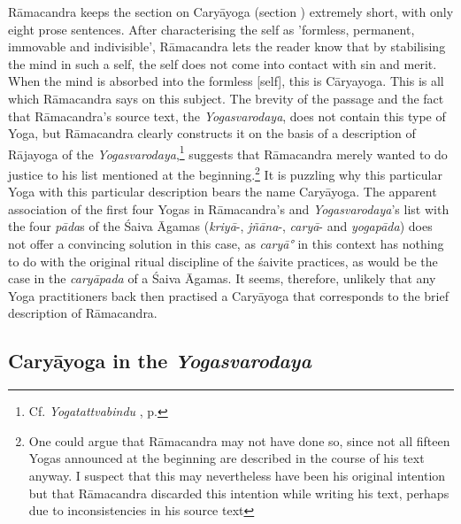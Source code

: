 Rāmacandra keeps the section on Caryāyoga (section ) extremely short, with only eight prose sentences. After characterising the self as 'formless, permanent, immovable and indivisible', Rāmacandra lets the reader know that by stabilising the mind in such a self, the self does not come into contact with sin and merit. When the mind is absorbed into the formless [self], this is Cāryayoga. This is all which Rāmacandra says on this subject. The brevity of the passage and the fact that Rāmacandra's source text, the \textit{Yogasvarodaya}, does not contain this type of Yoga, but Rāmacandra clearly constructs it on the basis of a description of Rājayoga of the \textit{Yogasvarodaya},\footnote{Cf. \textit{Yogatattvabindu} , p. \pageref{caryayoga}} suggests that Rāmacandra merely wanted to do justice to his list mentioned at the beginning.\footnote{One could argue that Rāmacandra may not have done so, since not all fifteen Yogas announced at the beginning are described in the course of his text anyway. I suspect that this may nevertheless have been his original intention but that Rāmacandra discarded this intention while writing his text, perhaps due to inconsistencies in his source text} It is puzzling why this particular Yoga with this particular description bears the name Caryāyoga. The apparent association of the first four Yogas in Rāmacandra's and \textit{Yogasvarodaya}'s list with the four \textit{pāda}s of the Śaiva Āgamas (\textit{kriyā}-, \textit{jñāna}-, \textit{caryā}- and \textit{yogapāda}) does not offer a convincing solution in this case, as \textit{caryā°} in this context has nothing to do with the original ritual discipline of the śaivite practices, as would be the case in the \textit{caryāpada} of a Śaiva Āgamas. It seems, therefore, unlikely that any Yoga practitioners back then practised a Caryāyoga that corresponds to the brief description of Rāmacandra. 

\subsection{Caryāyoga in the \textit{Yogasvarodaya}}

